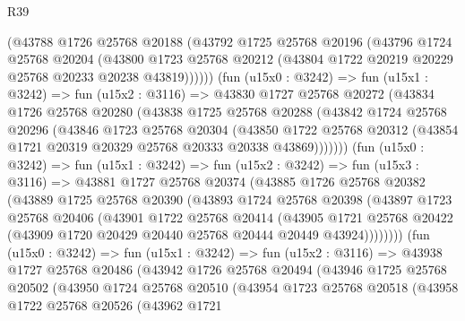 \begin{lexlean}{R39}
\begin{coremodule}
          (@43788
            @1726
            @25768
            @20188
            (@43792
              @1725
              @25768
              @20196
              (@43796
                @1724
                @25768
                @20204
                (@43800
                  @1723
                  @25768
                  @20212
                  (@43804 @1722 @20219 @20229 @25768 @20233 @20238 @43819))))))
        (fun (u15x0 : @3242) =>
        fun (u15x1 : @3242) =>
        fun (u15x2 : @3116) =>
        @43830
          @1727
          @25768
          @20272
          (@43834
            @1726
            @25768
            @20280
            (@43838
              @1725
              @25768
              @20288
              (@43842
                @1724
                @25768
                @20296
                (@43846
                  @1723
                  @25768
                  @20304
                  (@43850
                    @1722
                    @25768
                    @20312
                    (@43854 @1721 @20319 @20329 @25768 @20333 @20338 @43869)))))))
        (fun (u15x0 : @3242) =>
        fun (u15x1 : @3242) =>
        fun (u15x2 : @3242) =>
        fun (u15x3 : @3116) =>
        @43881
          @1727
          @25768
          @20374
          (@43885
            @1726
            @25768
            @20382
            (@43889
              @1725
              @25768
              @20390
              (@43893
                @1724
                @25768
                @20398
                (@43897
                  @1723
                  @25768
                  @20406
                  (@43901
                    @1722
                    @25768
                    @20414
                    (@43905
                      @1721
                      @25768
                      @20422
                      (@43909 @1720 @20429 @20440 @25768 @20444 @20449 @43924))))))))
        (fun (u15x0 : @3242) =>
        fun (u15x1 : @3242) =>
        fun (u15x2 : @3116) =>
        @43938
          @1727
          @25768
          @20486
          (@43942
            @1726
            @25768
            @20494
            (@43946
              @1725
              @25768
              @20502
              (@43950
                @1724
                @25768
                @20510
                (@43954
                  @1723
                  @25768
                  @20518
                  (@43958
                    @1722
                    @25768
                    @20526
                    (@43962
                      @1721

\end{coremodule}
\end{lexlean}
